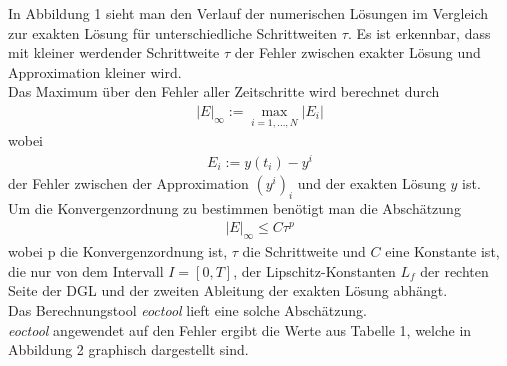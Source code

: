 \documentclass[11pt,a4paper]{article}
\begin{document}
In Abbildung 1 sieht man den Verlauf der numerischen L\"osungen im Vergleich zur exakten L\"osung f\"ur unterschiedliche Schrittweiten $\tau$. Es ist erkennbar, dass mit kleiner werdender Schrittweite $\tau$ der Fehler zwischen exakter L\"osung und Approximation kleiner wird.\\

Das Maximum \"uber den Fehler aller Zeitschritte wird berechnet durch
\begin{align*}
|E|_{\infty}:=\max_{i=1,...,N}|E_i|
\end{align*}
wobei
\begin{align*}
E_i:=y(t_i)-y^i
\end{align*}
der Fehler zwischen der Approximation $(y^i)_i$ und der exakten L\"osung $y$ ist.\\


Um die Konvergenzordnung zu bestimmen ben\"otigt man die Absch\"atzung
\begin{align*}
|E|_{\infty}{\leq} C{\tau}^p
\end{align*}
wobei p die Konvergenzordnung ist, $\tau$ die Schrittweite und $C$ eine Konstante ist, die nur von dem Intervall $I = [0,T]$, der Lipschitz-Konstanten $L_f$ der rechten Seite der DGL und der zweiten Ableitung der exakten L\"osung abh\"angt.\\

Das Berechnungstool \textit{eoctool} lieft eine solche Absch\"atzung.\\

\textit{eoctool} angewendet auf den Fehler ergibt die Werte aus Tabelle 1, welche in Abbildung 2 graphisch dargestellt sind.\\

\def\EntryA{N}%
\def\EntryB{expl. Euler}%
\def\EntryC{eoc}%
\def\EntryD{Crank-Nicolson}%
\def\EntryE{eoc}%
\def\EntryF{impli. Euler}%
\def\EntryG{eoc}%
\def\dec#1{{}_{#1}}%
\end{document}
